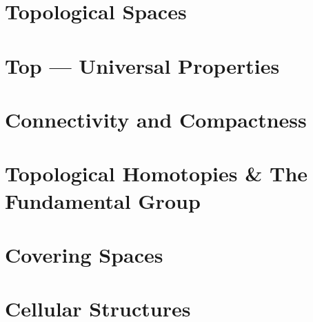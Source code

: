 \documentclass[../../../deep-dive]{subfiles}
\begin{document}
\chapter{Topological Spaces}









\chapter{\textbf{Top} --- Universal Properties}





\chapter{Connectivity and Compactness}



\chapter{Topological Homotopies \& The Fundamental Group}



\chapter{Covering Spaces}



\chapter{Cellular Structures}


\end{document}
